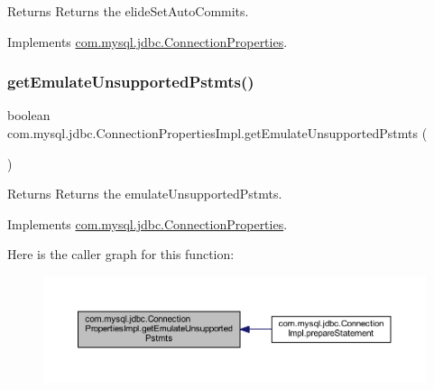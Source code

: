 \begin{DoxyReturn}{Returns}
Returns the elide\+Set\+Auto\+Commits. 
\end{DoxyReturn}


Implements \mbox{\hyperlink{interfacecom_1_1mysql_1_1jdbc_1_1_connection_properties_ad0c5071cd7d12eadb159a6b0cf8066c3}{com.\+mysql.\+jdbc.\+Connection\+Properties}}.

\mbox{\label{classcom_1_1mysql_1_1jdbc_1_1_connection_properties_impl_a20532164c4c808ec72758e2c9f6e96a7}} 
\subsubsection{\texorpdfstring{get\+Emulate\+Unsupported\+Pstmts()}{getEmulateUnsupportedPstmts()}}
{\footnotesize\ttfamily boolean com.\+mysql.\+jdbc.\+Connection\+Properties\+Impl.\+get\+Emulate\+Unsupported\+Pstmts (\begin{DoxyParamCaption}{ }\end{DoxyParamCaption})}

\begin{DoxyReturn}{Returns}
Returns the emulate\+Unsupported\+Pstmts. 
\end{DoxyReturn}


Implements \mbox{\hyperlink{interfacecom_1_1mysql_1_1jdbc_1_1_connection_properties_ac13c3eab30955ea55dcf84333aeb730f}{com.\+mysql.\+jdbc.\+Connection\+Properties}}.

Here is the caller graph for this function\+:\nopagebreak
\begin{figure}[H]
\begin{center}
\leavevmode
\includegraphics[width=350pt]{classcom_1_1mysql_1_1jdbc_1_1_connection_properties_impl_a20532164c4c808ec72758e2c9f6e96a7_icgraph}
\end{center}
\end{figure}
\mbox{\label{classcom_1_1mysql_1_1jdbc_1_1_connection_properties_impl_aa19f3ea922a728eee3891e844fccadae}} 
